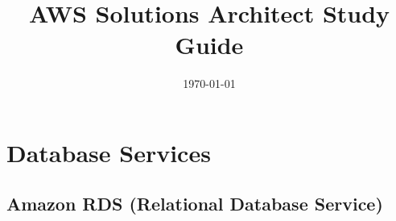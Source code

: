 \documentclass[11pt,a4paper]{report}
\begin{document}
\title{AWS Solutions Architect Study Guide}
\date{\today}
\maketitle

\tableofcontents
\newpage























\chapter{Database Services}



\section{Amazon RDS (Relational Database Service)}
\end{document}
